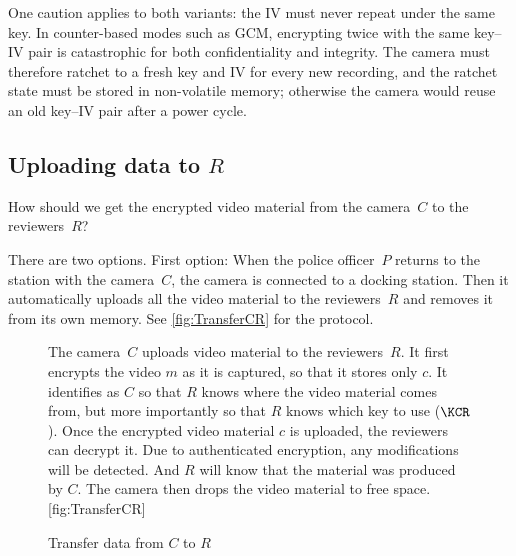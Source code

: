 One caution applies to both variants: the IV must never repeat under the
same key.
In counter-based modes such as \ac{GCM}, encrypting twice with the same
key--IV pair is catastrophic for both confidentiality and integrity.
The camera must therefore ratchet to a fresh key and IV for every new
recording, and the ratchet state must be stored in non-volatile memory;
otherwise the camera would reuse an old key--IV pair after a power cycle.

\subsection{Uploading data to \texorpdfstring{\(R\)}{R}}

\begin{exercise}
  How should we get the encrypted video material from the camera~\(C\) to the 
  reviewers~\(R\)?
\end{exercise}

There are two options.
First option:
When the police officer~\(P\) returns to the station with the camera~\(C\), the 
camera is connected to a docking station.
Then it automatically uploads all the video material to the reviewers~\(R\) and 
removes it from its own memory.
See \cref{fig:TransferCR} for the protocol.

\begin{figure}
  \begin{sidecaption}{%
    The camera~\(C\) uploads video material to the reviewers~\(R\).
    It first encrypts the video \(m\) as it is captured, so that it stores
    only \(c\).
    It identifies as \(C\) so that \(R\) knows where the video material
    comes from, but more importantly so that \(R\) knows which key to use
    (\(\KCR\)).
    Once the encrypted video material \(c\) is uploaded, the reviewers can 
    decrypt it.
    Due to authenticated encryption, any modifications will be detected.
    And \(R\) will know that the material was produced by \(C\).
    The camera then drops the video material to free space.
  }[fig:TransferCR]
  \flushright
  \begin{msc}
    [/msc/action width=0.4\linewidth]
    {Transfer data from \(C\) to \(R\)}
      \nextlevel[4]
      \nextlevel[2]
      \nextlevel
      \nextlevel
  \end{msc}
  \end{sidecaption}
\end{figure}

